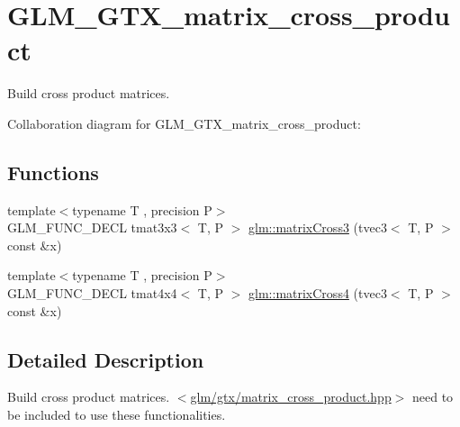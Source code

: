 \hypertarget{group__gtx__matrix__cross__product}{\section{G\-L\-M\-\_\-\-G\-T\-X\-\_\-matrix\-\_\-cross\-\_\-product}
\label{group__gtx__matrix__cross__product}
}


Build cross product matrices.  


Collaboration diagram for G\-L\-M\-\_\-\-G\-T\-X\-\_\-matrix\-\_\-cross\-\_\-product\-:
\subsection*{Functions}
\begin{DoxyCompactItemize}
\item 
{\footnotesize template$<$typename T , precision P$>$ }\\G\-L\-M\-\_\-\-F\-U\-N\-C\-\_\-\-D\-E\-C\-L tmat3x3$<$ T, P $>$ \hyperlink{group__gtx__matrix__cross__product_ga04385b2e3a93c78d116b51af2d8d708e}{glm\-::matrix\-Cross3} (tvec3$<$ T, P $>$ const \&x)
\item 
{\footnotesize template$<$typename T , precision P$>$ }\\G\-L\-M\-\_\-\-F\-U\-N\-C\-\_\-\-D\-E\-C\-L tmat4x4$<$ T, P $>$ \hyperlink{group__gtx__matrix__cross__product_ga2d46cc5253761c214aa5c782865156b1}{glm\-::matrix\-Cross4} (tvec3$<$ T, P $>$ const \&x)
\end{DoxyCompactItemize}


\subsection{Detailed Description}
Build cross product matrices. $<$\hyperlink{matrix__cross__product_8hpp}{glm/gtx/matrix\-\_\-cross\-\_\-product.\-hpp}$>$ need to be included to use these functionalities. 

